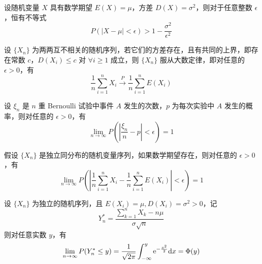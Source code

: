 \documentclass{ctexbook}
\def\diff{\textnormal{d}}
\def\e{\textnormal{e}}
\begin{document}
\begin{theorem}
    设随机变量 $X$ 具有数学期望 $E(X)=\mu$，方差 $D(X)=\sigma^2$，则对于任意整数 $\epsilon$，恒有不等式
    \begin{equation}
        P(|X-\mu|<\epsilon)>1-\frac{\sigma^2}{\epsilon^2}
    \end{equation}
\end{theorem}

\begin{theorem}
    设 $\{X_n\}$ 为两两互不相关的随机序列，若它们的方差存在，且有共同的上界，即存在常数 $c$，$D(X_i)\leq c$ 对 $\forall i\geq 1$ 成立，则 $\{X_n\}$ 服从大数定律，即对任意的 $\epsilon>0$，有
    \begin{equation}
        \frac{1}{n}\sum_{i=1}^nX_i\xrightarrow[]{P}\frac{1}{n}\sum_{i=1}^n E(X_i)
    \end{equation}
\end{theorem}

\begin{theorem}
    设 $\xi_n$ 是 $n$ 重 Bernoulli 试验中事件 $A$ 发生的次数，$p$ 为每次实验中 $A$ 发生的概率，则对任意的 $\epsilon>0$，有
    \begin{equation}
        \lim_{n\rightarrow\infty}P\left(\left|\frac{\xi_n}{n}-p\right|<\epsilon\right)=1
    \end{equation}
\end{theorem}

\begin{theorem}
    假设 $\{X_n\}$ 是独立同分布的随机变量序列，如果数学期望存在，则对任意的 $\epsilon>0$，有
    \begin{equation}
        \lim_{n\rightarrow\infty}P\left(\left|\frac{1}{n}\sum_{i=1}^n X_i-\frac{1}{n}\sum_{i=1}^n E(X_i)\right|<\epsilon\right) = 1
    \end{equation}
\end{theorem}

\begin{theorem}
    设 $\{X_n\}$ 为独立的随机序列，且 $E(X_i)=\mu, D(X_i)=\sigma^2>0$，记
    \begin{equation}
        Y_n^*=\frac{\sum_{k=1}^n X_k-n\mu}{\sigma\sqrt{n}}
    \end{equation}
    则对任意实数 $y$，有
    \begin{equation}\label{eq:central}
        \lim_{n\rightarrow\infty}P(Y_n^*\leq y)=\frac{1}{\sqrt{2\pi}}\int_{-\infty}^y\e^{-\frac{x^2}{2}}\diff x=\Phi(y)
    \end{equation}
\end{theorem}
\end{document}
